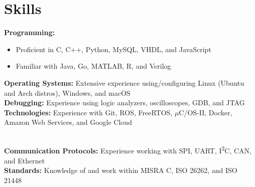 \documentclass[letterpaper,11pt]{article}
\newcommand{\resumeItem}[1]{
  \item\small{
    {#1 \vspace{-2pt}}
  }
}
\newcommand{\resumeSubHeadingListStart}{\begin{itemize}[leftmargin=0pt, label={}]}
\newcommand{\resumeSubHeadingListEnd}{\end{itemize}}
\newcommand{\resumeItemListStart}{\begin{itemize}}
\newcommand{\resumeItemListEnd}{\end{itemize}\vspace{-7pt}}
\begin{document}
\section{Skills}
\vspace{1pt}
\resumeSubHeadingListStart{}
  \small{\item{
      \textbf{Programming:} \vspace{-7pt}
      \resumeItemListStart{}
        \resumeItem{Proficient in C, C++, Python, MySQL, VHDL, and JavaScript}
        \resumeItem{Familiar with Java, Go, MATLAB, R, and Verilog}
      \resumeItemListEnd{}
      \textbf{Operating Systems:} Extensive experience using/configuring Linux (Ubuntu and Arch distros), Windows, and macOS \\ \vspace{1pt}
      \textbf{Debugging:} Experience using logic analyzers, oscilloscopes, GDB, and JTAG \\ \vspace{1pt}
      \textbf{Technologies:} Experience with Git, ROS, FreeRTOS, $\mu{}$C/OS-II, Docker, Amazon Web Services, and Google Cloud} \\ \vspace{1pt}
      \textbf{Communication Protocols:} Experience working with SPI, UART, I\textsuperscript{2}C, CAN, and Ethernet \\ \vspace{1pt}
      \textbf{Standards:} Knowledge of and work within MISRA C, ISO 26262, and ISO 21448 \\ \vspace{1pt}
  }
\resumeSubHeadingListEnd{}
\end{document}
